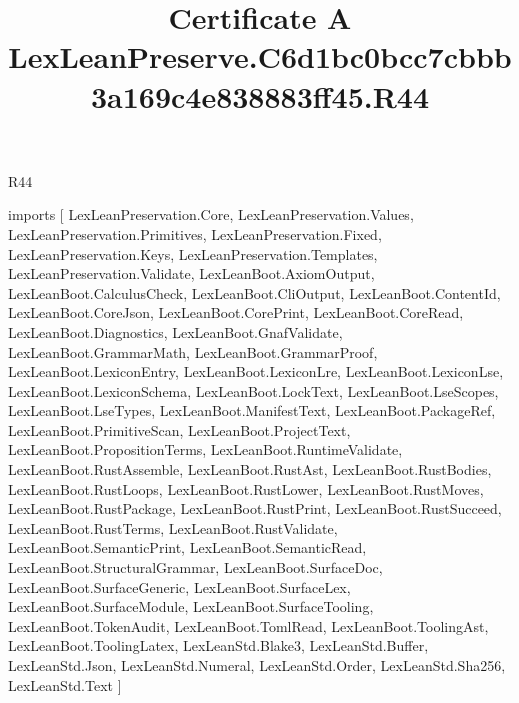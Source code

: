 \begin{lexlean}{R44}
\title{Certificate A LexLeanPreserve.C6d1bc0bcc7cbbb3a169c4e838883ff45.R44}
\begin{coremodule}
imports [
  LexLeanPreservation.Core,
  LexLeanPreservation.Values,
  LexLeanPreservation.Primitives,
  LexLeanPreservation.Fixed,
  LexLeanPreservation.Keys,
  LexLeanPreservation.Templates,
  LexLeanPreservation.Validate,
  LexLeanBoot.AxiomOutput,
  LexLeanBoot.CalculusCheck,
  LexLeanBoot.CliOutput,
  LexLeanBoot.ContentId,
  LexLeanBoot.CoreJson,
  LexLeanBoot.CorePrint,
  LexLeanBoot.CoreRead,
  LexLeanBoot.Diagnostics,
  LexLeanBoot.GnafValidate,
  LexLeanBoot.GrammarMath,
  LexLeanBoot.GrammarProof,
  LexLeanBoot.LexiconEntry,
  LexLeanBoot.LexiconLre,
  LexLeanBoot.LexiconLse,
  LexLeanBoot.LexiconSchema,
  LexLeanBoot.LockText,
  LexLeanBoot.LseScopes,
  LexLeanBoot.LseTypes,
  LexLeanBoot.ManifestText,
  LexLeanBoot.PackageRef,
  LexLeanBoot.PrimitiveScan,
  LexLeanBoot.ProjectText,
  LexLeanBoot.PropositionTerms,
  LexLeanBoot.RuntimeValidate,
  LexLeanBoot.RustAssemble,
  LexLeanBoot.RustAst,
  LexLeanBoot.RustBodies,
  LexLeanBoot.RustLoops,
  LexLeanBoot.RustLower,
  LexLeanBoot.RustMoves,
  LexLeanBoot.RustPackage,
  LexLeanBoot.RustPrint,
  LexLeanBoot.RustSucceed,
  LexLeanBoot.RustTerms,
  LexLeanBoot.RustValidate,
  LexLeanBoot.SemanticPrint,
  LexLeanBoot.SemanticRead,
  LexLeanBoot.StructuralGrammar,
  LexLeanBoot.SurfaceDoc,
  LexLeanBoot.SurfaceGeneric,
  LexLeanBoot.SurfaceLex,
  LexLeanBoot.SurfaceModule,
  LexLeanBoot.SurfaceTooling,
  LexLeanBoot.TokenAudit,
  LexLeanBoot.TomlRead,
  LexLeanBoot.ToolingAst,
  LexLeanBoot.ToolingLatex,
  LexLeanStd.Blake3,
  LexLeanStd.Buffer,
  LexLeanStd.Json,
  LexLeanStd.Numeral,
  LexLeanStd.Order,
  LexLeanStd.Sha256,
  LexLeanStd.Text
]


\end{coremodule}
\end{lexlean}
